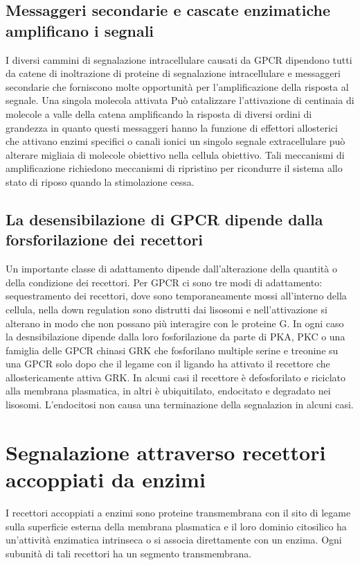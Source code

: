 \subsection{Messaggeri secondarie e cascate enzimatiche amplificano i segnali}
I diversi cammini di segnalazione intracellulare causati da GPCR dipendono tutti da catene di inoltrazione di proteine di segnalazione intracellulare e messaggeri secondarie che 
forniscono molte opportunit\`a per l'amplificazione della risposta al segnale. Una singola molecola attivata Pu\`o catalizzare l'attivazione di centinaia di molecole a valle della
catena amplificando la risposta di diversi ordini di grandezza in quanto questi messaggeri hanno la funzione di effettori allosterici che attivano enzimi specifici o canali ionici
un singolo segnale extracellulare pu\`o alterare migliaia di molecole obiettivo nella cellula obiettivo. Tali meccanismi di amplificazione richiedono meccanismi di ripristino per
ricondurre il sistema allo stato di riposo quando la stimolazione cessa. 
\subsection{La desensibilazione di GPCR dipende dalla forsforilazione dei recettori}
Un importante classe di adattamento dipende dall'alterazione della quantit\`a o della condizione dei recettori. Per GPCR ci sono tre modi di adattamento: sequestramento dei recettori, 
dove sono temporaneamente mossi all'interno della cellula, nella down regulation sono distrutti dai lisosomi e nell'attivazione si alterano in modo che non possano pi\`u interagire 
con le proteine G. In ogni caso la desnsibilazione dipende dalla loro fosforilazione da parte di PKA, PKC o una famiglia delle GPCR chinasi GRK che fosforilano multiple serine e 
treonine su una GPCR solo dopo che il legame con il ligando ha attivato il recettore che allostericamente attiva GRK. In alcuni casi il recettore \`e defosforilato e riciclato 
alla membrana plasmatica, in altri \`e ubiquitilato, endocitato e degradato nei lisosomi. L'endocitosi non causa una terminazione della segnalazion in alcuni casi. 
\section{Segnalazione attraverso recettori accoppiati da enzimi}
I recettori accoppiati a enzimi sono proteine transmembrana con il sito di legame sulla superficie esterna della membrana plasmatica e il loro dominio citosilico ha un'attivit\`a 
enzimatica intrinseca o si associa direttamente con un enzima. Ogni subunit\`a di tali recettori ha un segmento transmembrana. 
